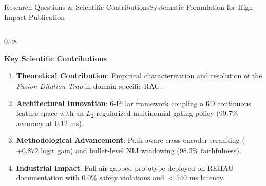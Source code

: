 \documentclass[aspectratio=169,10pt]{beamer}
\begin{document}
\begin{frame}{Research Questions \& Scientific Contributions}{Systematic Formulation for High-Impact Publication}
\begin{columns}[T]
    \begin{column}{0.48\textwidth}
      \begin{exampleblock}{\textbf{Key Scientific Contributions}}
        \scriptsize
        \begin{enumerate}\setlength\itemsep{0.15ex}
          \item \textbf{Theoretical Contribution}: Empirical characterization and resolution of the \textit{Fusion Dilution Trap} in domain-specific RAG.
          \item \textbf{Architectural Innovation}: 6-Pillar framework coupling a 6D continuous feature space with an $L_2$-regularized multinomial gating policy (99.7\% accuracy at 0.12 ms).
          \item \textbf{Methodological Advancement}: Path-aware cross-encoder reranking ($+0.872$ logit gain) and bullet-level NLI windowing (98.3\% faithfulness).
          \item \textbf{Industrial Impact}: Full air-gapped prototype deployed on REHAU documentation with 0.0\% safety violations and $<540$ ms latency.
        \end{enumerate}
      \end{exampleblock}
    \end{column}
  \end{columns}
\end{frame}
\end{document}
